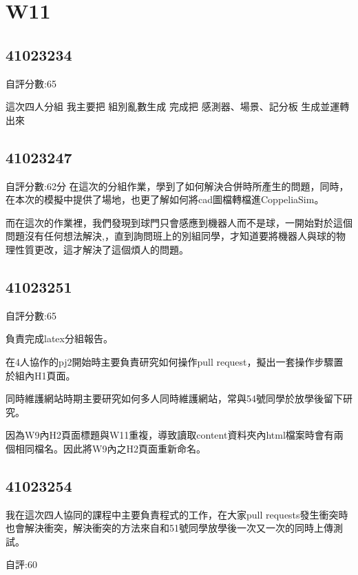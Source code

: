 \chapter{W11}


\section{41023234}
自評分數:65

這次四人分組 我主要把  組別亂數生成  完成把  感測器、場景、記分板  生成並運轉出來


\section{41023247}
自評分數:62分
在這次的分組作業，學到了如何解決合併時所產生的問題，同時，在本次的模擬中提供了場地，也更了解如何將cad圖檔轉檔進CoppeliaSim。

而在這次的作業裡，我們發現到球門只會感應到機器人而不是球，一開始對於這個問題沒有任何想法解決,，直到詢問班上的別組同學，才知道要將機器人與球的物理性質更改，這才解決了這個煩人的問題。
\section{41023251}

自評分數:65

負責完成latex分組報告。

在4人協作的pj2開始時主要負責研究如何操作pull request，擬出一套操作步驟置於組內H1頁面。

同時維護網站時期主要研究如何多人同時維護網站，常與54號同學於放學後留下研究。

因為W9內H2頁面標題與W11重複，導致讀取content資料夾內html檔案時會有兩個相同檔名。因此將W9內之H2頁面重新命名。

\section{41023254}

我在這次四人協同的課程中主要負責程式的工作，在大家pull requests發生衝突時也會解決衝突，解決衝突的方法來自和51號同學放學後一次又一次的同時上傳測試。

自評:60